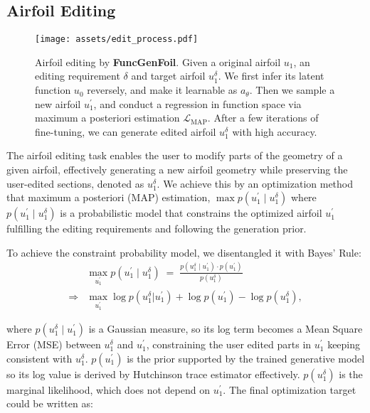 \subsection{Airfoil Editing}

\begin{figure}[t]
    \small
    \centering
      \texttt{[image: assets/edit\_process.pdf]}
      \caption{Airfoil editing by \textbf{FuncGenFoil}. Given a original airfoil $u_1$, an editing requirement $\delta$ and target airfoil $u_1^{\delta}$. We first infer its latent function $u_0$ reversely, and make it learnable as $a_{\theta}$. Then we sample a new airfoil $u_1^{'}$, and conduct a regression in function space via maximum a posteriori estimation $\mathcal{L}_{\mathrm{MAP}}$. After a few iterations of fine-tuning, we can generate edited airfoil $u_1^{\delta}$ with high accuracy.}
      \label{fig:editing}
      
\end{figure}

The airfoil editing task enables the user to modify parts of the geometry of a given airfoil, effectively generating a new airfoil geometry while preserving the user-edited sections, denoted as $u_1^{\delta}$. 
We achieve this by an optimization method that maximum a posteriori (MAP) estimation, $\max p(u_1^{'} \mid u_1^{\delta})$ where $p(u_1^{'} \mid u_1^{\delta})$ is a probabilistic model that constrains the optimized airfoil $u_1^{'}$ fulfilling the editing requirements and following the generation prior.



To achieve the constraint probability model, we disentangled it with Bayes' Rule:
\begin{equation}
\begin{aligned}\label{eq:map}
    &\max_{u_1^{'}} p(u_1^{'} \mid u_1^{\delta})
    \;=\;
    \frac{p(u_1^{\delta} \mid u_1^{'})\cdot p(u_1^{'})}{p(u_1^{\delta})}\\
    \Rightarrow
    &\max_{u_1^{'}} \log{p(u_1^{\delta}|u_1^{'})} + \log{p(u_1^{'})} - \log{p(u_1^{\delta})},
\end{aligned}
\end{equation}

where $p(u_1^{\delta} \mid u_1^{'})$ is a Gaussian measure, so its log term becomes a Mean Square Error (MSE) between $u_1^{\delta}$ and $u_1^{'}$, constraining the user edited parts in $u_1^{'}$ keeping consistent with $u_1^{\delta}$. 
$p(u_1^{'})$ is the prior supported by the trained generative model so its log value is derived by Hutchinson trace estimator \cite{Hutchinson1989,Grathwohl2018} effectively.  
$p(u_1^{\delta})$ is the marginal likelihood, which does not depend on $u_1^{'}$. The final optimization target could be written as:

